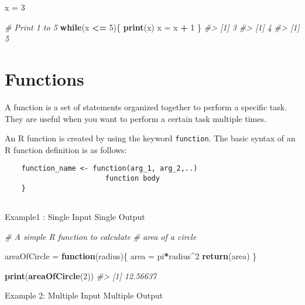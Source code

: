 \documentclass[
]{book}
\newenvironment{Shaded}{\begin{snugshade}}{\end{snugshade}}
\newcommand{\CommentTok}[1]{\textcolor[rgb]{0.56,0.35,0.01}{\textit{#1}}}
\newcommand{\ControlFlowTok}[1]{\textcolor[rgb]{0.13,0.29,0.53}{\textbf{#1}}}
\newcommand{\DecValTok}[1]{\textcolor[rgb]{0.00,0.00,0.81}{#1}}
\newcommand{\FunctionTok}[1]{\textcolor[rgb]{0.13,0.29,0.53}{\textbf{#1}}}
\newcommand{\NormalTok}[1]{#1}
\newcommand{\OtherTok}[1]{\textcolor[rgb]{0.56,0.35,0.01}{#1}}
\newcommand{\SpecialCharTok}[1]{\textcolor[rgb]{0.81,0.36,0.00}{\textbf{#1}}}
\begin{document}
\begin{Shaded}
\begin{Highlighting}[]
\NormalTok{x }\OtherTok{=} \DecValTok{3}

\CommentTok{\# Print 1 to 5 }
\ControlFlowTok{while}\NormalTok{(x }\SpecialCharTok{\textless{}=} \DecValTok{5}\NormalTok{)\{ }
  \FunctionTok{print}\NormalTok{(x) }
\NormalTok{  x }\OtherTok{=}\NormalTok{ x }\SpecialCharTok{+} \DecValTok{1}
\NormalTok{\}}
\CommentTok{\#\textgreater{} [1] 3}
\CommentTok{\#\textgreater{} [1] 4}
\CommentTok{\#\textgreater{} [1] 5}
\end{Highlighting}
\end{Shaded}

\hypertarget{functions}{%
\section{Functions}\label{functions}}

A function is a set of statements organized together to perform a specific task. They are useful when you want to perform a certain task multiple times.

An R function is created by using the keyword \texttt{function}. The basic syntax of an R function definition is as follows:

\begin{verbatim}
    function_name <- function(arg_1, arg_2,..) 
                        function body
    }
    
\end{verbatim}

Example1 : Single Input Single Output

\begin{Shaded}
\begin{Highlighting}[]
\CommentTok{\# A simple R function to calculate }
\CommentTok{\# area of a circle}
 
\NormalTok{areaOfCircle }\OtherTok{=} \ControlFlowTok{function}\NormalTok{(radius)\{}
\NormalTok{  area }\OtherTok{=}\NormalTok{ pi}\SpecialCharTok{*}\NormalTok{radius}\SpecialCharTok{\^{}}\DecValTok{2}
  \FunctionTok{return}\NormalTok{(area)}
\NormalTok{\}}
 
\FunctionTok{print}\NormalTok{(}\FunctionTok{areaOfCircle}\NormalTok{(}\DecValTok{2}\NormalTok{))}
\CommentTok{\#\textgreater{} [1] 12.56637}
\end{Highlighting}
\end{Shaded}

Example 2: Multiple Input Multiple Output
\end{document}
